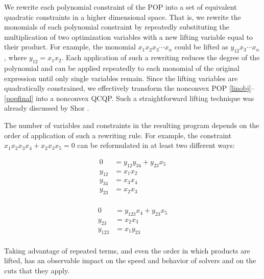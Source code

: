 We rewrite each polynomial constraint of the POP into a set of equivalent quadratic constraints in a higher dimensional space. That is, we rewrite the monomials of each polynomial constraint by repeatedly substituting the multiplication of two optimization variables with a new lifting variable equal to their product. For example, the monomial $x_1x_2x_3\cdots x_n$ could be lifted as $y_{12}x_3\cdots x_n$, where $y_{12}=x_1x_2$. Each application of such a rewriting reduces the degree of the polynomial and can be applied repeatedly to each monomial of the original expression until only single variables remain. Since the lifting variables are quadratically constrained, we effectively transform the nonconvex POP \eqref{linobj}--\eqref{popfinal} into a nonconvex QCQP. Such a straightforward lifting technique was already discussed by Shor \cite{Shor1987}.

The number of variables and constraints in the resulting program depends on the order of application of such a rewriting rule. For example, the constraint $x_1x_2x_3x_4 + x_2x_3x_5 = 0$ can be reformulated in at least two different ways:

\vspace{0.5em}
\noindent\begin{minipage}{.5\linewidth}
\[
\label{eq:liftA}
\tag{A}
\begin{aligned}
    0 &= y_{12}y_{34} + y_{23}x_5 \\
    y_{12} &= x_1x_2 \\
    y_{34} &= x_3x_4 \\
    y_{23} &= x_2x_3 \\
\end{aligned}
\]
\end{minipage}%
\noindent\begin{minipage}{.5\linewidth}
\[
\tag{B}
\begin{aligned}
    0 &= y_{123}x_4 + y_{23}x_5 \\
    y_{23} &= x_2x_3 \\
    y_{123} &= x_1y_{23} \\
\end{aligned}
\]
\end{minipage}

\par\vspace*{1em}\noindent Taking advantage of repeated terms, and even the order in which products are lifted, has an observable impact on the speed and behavior of solvers and on the cuts that they apply.

